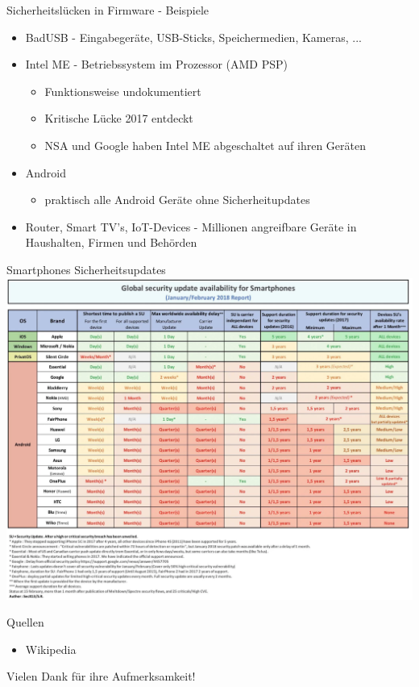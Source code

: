 \documentclass[10pt]{beamer}
\begin{document}
\begin{frame}[fragile]{Sicherheitsl\"ucken in Firmware - Beispiele}
  \begin{itemize}
    \item BadUSB - Eingabeger\"ate, USB-Sticks, Speichermedien, Kameras, ...
    \item Intel ME - Betriebssystem im Prozessor (AMD PSP)
      \begin{itemize}
        \item Funktionsweise undokumentiert
        \item Kritische L\"ucke 2017 entdeckt
        \item NSA und Google haben Intel ME abgeschaltet auf ihren Ger\"aten
      \end{itemize}
    \item Android
      \begin{itemize}
        \item praktisch alle Android Ger\"ate ohne Sicherheitupdates
      \end{itemize}
    \item Router, Smart TV's, IoT-Devices - Millionen angreifbare Ger\"ate in Haushalten, Firmen und Beh\"orden
  \end{itemize}
\end{frame}

\begin{frame}[fragile]{Smartphones Sicherheitsupdates}
  \includegraphics[scale=0.5]{android_sub}
  \newline
\end{frame}

\begin{frame}[fragile]{Quellen}
  \begin{itemize}
    \item Wikipedia
  \end{itemize}
\end{frame}

\begin{frame}[fragile]{}
  \huge Vielen Dank f\"ur ihre Aufmerksamkeit!
\end{frame}
\end{document}
